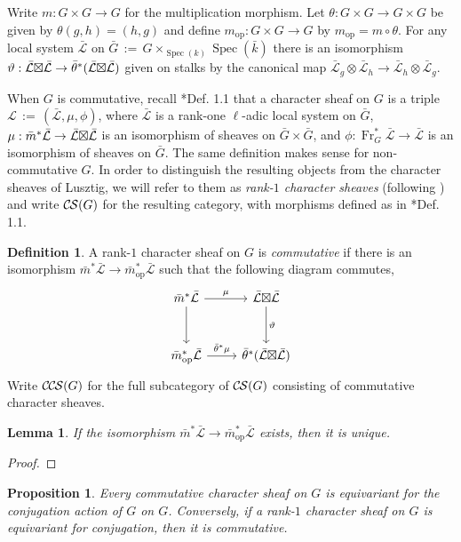 \documentclass[10pt]{amsart}
\theoremstyle{plain}
\newtheorem{proposition}[theorem]{Proposition}
\newtheorem{lemma}[theorem]{Lemma}
\theoremstyle{definition}
\newtheorem{definition}[theorem]{Definition}
\newcommand{\bFq}{\bar{k}}
\newcommand{\Fq}{k}
\newcommand{\Frob}[1]{\operatorname{Fr}_{#1}}
\newcommand{\Spec}[1]{{\operatorname{Spec}(#1)}}
\newcommand{\op}{_{\operatorname{op}}}
\newcommand{\ceq}{{\, :=\, }}
\newcommand{\cs}[1]{{\mathcal{#1}}}
\newcommand{\gcs}[1]{{\mathcal{\bar #1}}}
\newcommand{\CS}{{\mathcal{C\hskip-0.8pt S}}}
\newcommand{\CCS}{{\mathcal{C\hskip-.8pt C\hskip-0.8pt S}}}
\newcommand{\bm}{\bar{m}}
\newcommand{\bG}{\bar{G}}
\newcommand{\tight}[3]{\hspace{-#1pt}{#2}\hspace{-#3pt}}
\newcommand{\LxL}{\text{$\gcs{L} \tight{0}{\boxtimes}{0} \gcs{L}$}}
\begin{document}
Write $m : G \times G \to G$ for the multiplication morphism.
Let $\theta : G\times G \to G\times G$ be given by $\theta(g,h) = (h,g)$
and define $m\op : G \times G \to G$ by $m\op = m \circ \theta$.
For any local system $\gcs{L}$ on $\bG \ceq G \times_{\Spec{\Fq}} \Spec{\bFq}$ there is an isomorphism
$\vartheta : \LxL \to {\bar \theta}^*(\LxL)$ given on stalks by the canonical map
$\gcs{L}_{g} \otimes \gcs{L}_{h} \to \gcs{L}_{h} \otimes \gcs{L}_{g}$.

When $G$ is commutative, recall \cite{cunningham-roe:13a}*{Def. 1.1} that a character sheaf on $G$ is a triple $\cs{L} \ceq (\gcs{L}, \mu, \phi)$,
where $\gcs{L}$ is a rank-one $\ell$-adic local system on $\bG$, $\mu : \bm^* \gcs{L} \to \LxL$ is an isomorphism
of sheaves on $\bG \times \bG$, and $\phi : \Frob{G}^* \gcs{L} \to \gcs{L}$ is an isomorphism of sheaves on $\bG$.
The same definition makes sense for non-commutative $G$.  In order to distinguish the resulting objects from
the character sheaves of Lusztig, we will refer to them as \emph{rank-$1$ character sheaves} (following \cite{Kamgarpour})
and write $\CS(G)$ for the resulting category, with morphisms defined as in \cite{cunningham-roe:13a}*{Def. 1.1}.

\begin{definition}\label{def:CCS}
A rank-$1$ character sheaf on $G$ is \emph{commutative} if there is an isomorphism ${\bar m}^* \gcs{L} \to {\bar m}\op^* \gcs{L}$
such that the following diagram commutes,
  \[
  \begin{tikzcd}[row sep=30]
   \bm^*\gcs{L} \arrow{d} \arrow{r}{\mu} & \LxL \arrow{d}{\vartheta}\\
   \bm\op^*\gcs{L} \arrow{r}{{\bar \theta}^*\mu} &  {\bar \theta}^*(\LxL)
  \end{tikzcd}
  \]
 Write $\CCS(G)$ for the full subcategory of $\CS(G)$ consisting of commutative character sheaves.
 \end{definition}
 

\begin{lemma}
If the isomorphism ${\bar m}^* \gcs{L} \to {\bar m}\op^* \gcs{L}$ exists, then it is unique.
\end{lemma}
\begin{proof}
\end{proof}

\begin{proposition}
Every commutative character sheaf on $G$ is equivariant for the conjugation action of $G$ on $G$. Conversely, if a rank-$1$ character sheaf on $G$ is equivariant for conjugation, then it is commutative. 
\end{proposition}
\end{document}
